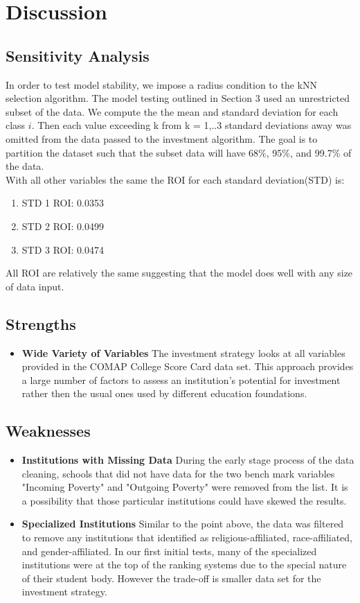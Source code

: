 \documentclass[12pt]{scrartcl}
\begin{document}
\section{Discussion} 
	\subsection{Sensitivity Analysis}
		In order to test model stability, we impose a radius condition to the kNN selection algorithm. The model testing outlined in Section 3 used an unrestricted subset of the data. We compute the the mean and standard deviation for each class $i$. Then each value exceeding k from k = 1,..3 standard deviations away was omitted from the data passed to the investment algorithm. The goal is to partition the dataset such that the subset data will have 68\%, 95\%, and 99.7\% of the data.\\

		With all other variables the same the ROI for each standard deviation(STD) is:
		\begin{enumerate}
		\item STD 1 ROI: 0.0353
		\item STD 2 ROI: 0.0499
		\item STD 3 ROI: 0.0474
		\end{enumerate}

		All ROI are relatively the same suggesting that the model does well with any size of data input. 

	\subsection{Strengths}
		\begin{itemize}
		\item \textbf{Wide Variety of Variables} The investment strategy looks at all variables provided in the COMAP College Score Card data set. This approach provides a large number of factors to assess an institution's potential for investment rather then the usual ones used by different education foundations. 
		\end{itemize}

	\subsection{Weaknesses}
		\begin{itemize}
		\item \textbf{Institutions with Missing Data} During the early stage process of the data cleaning, schools that did not have data for the two bench mark variables "Incoming Poverty" and "Outgoing Poverty" were removed from the list. It is a possibility that those particular institutions could have skewed the results.
		\item \textbf{Specialized Institutions} Similar to the point above, the data was filtered to remove any institutions that identified as religious-affiliated, race-affiliated, and gender-affiliated. In our first initial tests, many of the specialized institutions were at the top of the ranking systems due to the special nature of their student body. However the trade-off is smaller data set for the investment strategy. 
		\end{itemize}
\end{document}
